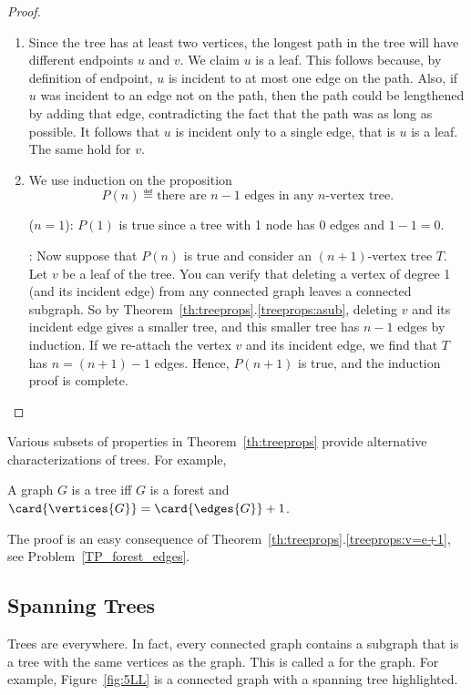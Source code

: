 \begin{proof}
\begin{enumerate}
\item
  Since the tree has at least two vertices, the longest path in the
  tree will have different endpoints $u$ and $v$.  We claim $u$ is a
  leaf.  This follows because, by definition of endpoint, $u$ is
  incident to at most one edge on the path.  Also, if $u$ was incident to
  an edge not on the path, then the path could be lengthened by adding
  that edge, contradicting the fact that the path was as long as
  possible.  It follows that $u$ is incident only to a single edge,
  that is $u$ is a leaf.  The same hold for $v$.

\item We use induction on the proposition
\[
P(n) \eqdef \text{there are $n - 1$ edges in any $n$-vertex tree}.
\]

 ($n = 1$): $P(1)$ is true since a tree with
1 node has 0 edges and $1 - 1 = 0$.

: Now suppose that $P(n)$ is true and
consider an $(n+1)$-vertex tree $T$.  Let $v$ be a leaf of the tree.
You can verify that deleting a vertex of degree 1 (and its incident
edge) from any connected graph leaves a connected subgraph.  So by
Theorem~\ref{th:treeprops}.\ref{treeprops:asub}, deleting $v$ and its
incident edge gives a smaller tree, and this smaller tree has $n - 1$
edges by induction.  If we re-attach the vertex $v$ and its incident
edge, we find that $T$ has $n = (n + 1) - 1$ edges.  Hence, $P(n + 1)$
is true, and the induction proof is complete.  \qedhere

\end{enumerate}

\end{proof}

Various subsets of properties in Theorem~\ref{th:treeprops} provide
alternative characterizations of trees.  For example,

\begin{lemma}\label{lem:iffe=v-1}
A graph $G$ is a tree iff $G$ is a forest and $\card{\vertices{G}} =
\card{\edges{G}} +1$.
\end{lemma}

The proof is an easy consequence of
Theorem~\ref{th:treeprops}.\ref{treeprops:v=e+1}, see
Problem~\ref{TP_forest_edges}.

\subsection{Spanning Trees}\label{spantree_subsec}
Trees are everywhere.  In fact, every connected graph contains a
subgraph that is a tree with the same vertices as the graph.  This is
called a  for the graph.  For example,
Figure~\ref{fig:5LL} is a connected graph with a spanning tree
highlighted.

